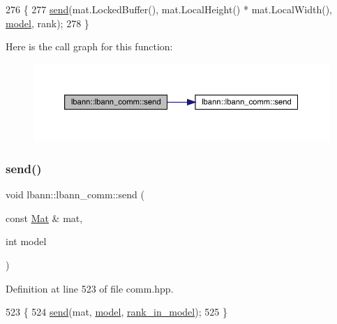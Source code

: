 \begin{DoxyCode}
276                                                              \{
277   \hyperlink{classlbann_1_1lbann__comm_a086078b881e7250df140ac116adb1939}{send}(mat.LockedBuffer(), mat.LocalHeight() * mat.LocalWidth(), \hyperlink{namespacelbann_adee41f31f15f3906cbdcce4a1417eb56a20f35e630daf44dbfa4c3f68f5399d8c}{model}, rank);
278 \}
\end{DoxyCode}
Here is the call graph for this function\+:\nopagebreak
\begin{figure}[H]
\begin{center}
\leavevmode
\includegraphics[width=350pt]{classlbann_1_1lbann__comm_ae6ad297cccfc9ed893b855046d60b34d_cgraph}
\end{center}
\end{figure}
\mbox{\label{classlbann_1_1lbann__comm_a4dc53b43a36e597a0c11266ea3c6d7f7}} 
\subsubsection{\texorpdfstring{send()}{send()}\hspace{0.1cm}{\footnotesize\ttfamily [5/6]}}
{\footnotesize\ttfamily void lbann\+::lbann\+\_\+comm\+::send (\begin{DoxyParamCaption}\item[{const \hyperlink{base_8hpp_a68f11fdc31b62516cb310831bbe54d73}{Mat} \&}]{mat,  }\item[{int}]{model }\end{DoxyParamCaption})\hspace{0.3cm}{\ttfamily [inline]}}



Definition at line 523 of file comm.\+hpp.


\begin{DoxyCode}
523                                        \{
524     \hyperlink{classlbann_1_1lbann__comm_a086078b881e7250df140ac116adb1939}{send}(mat, \hyperlink{namespacelbann_adee41f31f15f3906cbdcce4a1417eb56a20f35e630daf44dbfa4c3f68f5399d8c}{model}, \hyperlink{classlbann_1_1lbann__comm_a0dcccd57c2b591eb7682e192e0a09033}{rank\_in\_model});
525   \}
\end{DoxyCode}
\mbox{\label{classlbann_1_1lbann__comm_aeb76535e61e5bc669ebadad223e4add7}} 
